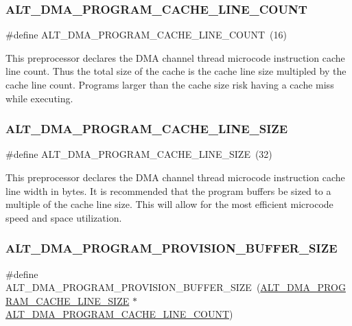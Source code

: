 \subsubsection{\texorpdfstring{ALT\_DMA\_PROGRAM\_CACHE\_LINE\_COUNT}{ALT\_DMA\_PROGRAM\_CACHE\_LINE\_COUNT}}
{\footnotesize\ttfamily \#define A\+L\+T\+\_\+\+D\+M\+A\+\_\+\+P\+R\+O\+G\+R\+A\+M\+\_\+\+C\+A\+C\+H\+E\+\_\+\+L\+I\+N\+E\+\_\+\+C\+O\+U\+NT~(16)}

This preprocessor declares the D\+MA channel thread microcode instruction cache line count. Thus the total size of the cache is the cache line size multipled by the cache line count. Programs larger than the cache size risk having a cache miss while executing. \mbox{\label{group__ALT__DMA__PRG_gae9006d74c88b55b9b19e8b51882dc345}} 
\subsubsection{\texorpdfstring{ALT\_DMA\_PROGRAM\_CACHE\_LINE\_SIZE}{ALT\_DMA\_PROGRAM\_CACHE\_LINE\_SIZE}}
{\footnotesize\ttfamily \#define A\+L\+T\+\_\+\+D\+M\+A\+\_\+\+P\+R\+O\+G\+R\+A\+M\+\_\+\+C\+A\+C\+H\+E\+\_\+\+L\+I\+N\+E\+\_\+\+S\+I\+ZE~(32)}

This preprocessor declares the D\+MA channel thread microcode instruction cache line width in bytes. It is recommended that the program buffers be sized to a multiple of the cache line size. This will allow for the most efficient microcode speed and space utilization. \mbox{\label{group__ALT__DMA__PRG_gad2247d4b56108fe0ab3690c2bc1b6d08}} 
\subsubsection{\texorpdfstring{ALT\_DMA\_PROGRAM\_PROVISION\_BUFFER\_SIZE}{ALT\_DMA\_PROGRAM\_PROVISION\_BUFFER\_SIZE}}
{\footnotesize\ttfamily \#define A\+L\+T\+\_\+\+D\+M\+A\+\_\+\+P\+R\+O\+G\+R\+A\+M\+\_\+\+P\+R\+O\+V\+I\+S\+I\+O\+N\+\_\+\+B\+U\+F\+F\+E\+R\+\_\+\+S\+I\+ZE~(\mbox{\hyperlink{group__ALT__DMA__PRG_gae9006d74c88b55b9b19e8b51882dc345}{A\+L\+T\+\_\+\+D\+M\+A\+\_\+\+P\+R\+O\+G\+R\+A\+M\+\_\+\+C\+A\+C\+H\+E\+\_\+\+L\+I\+N\+E\+\_\+\+S\+I\+ZE}} $\ast$ \mbox{\hyperlink{group__ALT__DMA__PRG_gab1f145c6cd73c64707ef47ba15550b3b}{A\+L\+T\+\_\+\+D\+M\+A\+\_\+\+P\+R\+O\+G\+R\+A\+M\+\_\+\+C\+A\+C\+H\+E\+\_\+\+L\+I\+N\+E\+\_\+\+C\+O\+U\+NT}})}

